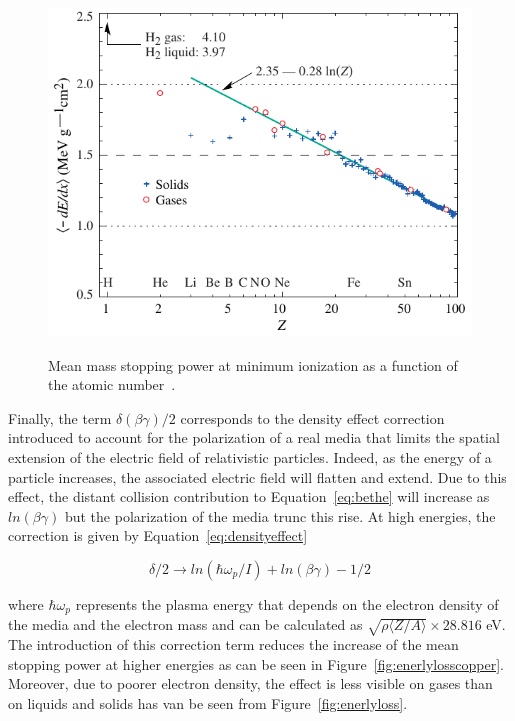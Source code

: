 	\begin{figure}[H]
		\centering
		\includegraphics[width = 0.8\plotwidth]{fig/chapt4/dedx_min_06.pdf}\\
		\caption{\label{fig:miplossrate} Mean mass stopping power at minimum ionization as a function of the atomic number~\cite{PDG2016}.}
	\end{figure}
	
	Finally, the term $\delta(\beta\gamma)/2$ corresponds to the density effect correction introduced to account for the polarization of a real media that limits the spatial extension of the electric field of relativistic particles. Indeed, as the energy of a particle increases, the associated electric field will flatten and extend. Due to this effect, the distant collision contribution to Equation~\ref{eq:bethe} will increase as $ln(\beta\gamma)$ but the polarization of the media trunc this rise. At high energies, the correction is given by Equation~\ref{eq:densityeffect}
	
	\begin{equation}
	\label{eq:densityeffect}
	\delta/2 \longrightarrow ln(\hbar\omega_p/I) + ln(\beta\gamma) - 1/2
	\end{equation}
	
	where $\hbar\omega_p$ represents the plasma energy that depends on the electron density of the media and the electron mass and can be calculated as $\sqrt{\rho\langle Z/A \rangle} \times 28.816$ \si{eV}. The introduction of this correction term reduces the increase of the mean stopping power at higher energies as can be seen in Figure~\ref{fig:enerlylosscopper}. Moreover, due to poorer electron density, the effect is less visible on gases than on liquids and solids has van be seen from Figure~\ref{fig:enerlyloss}.
	
